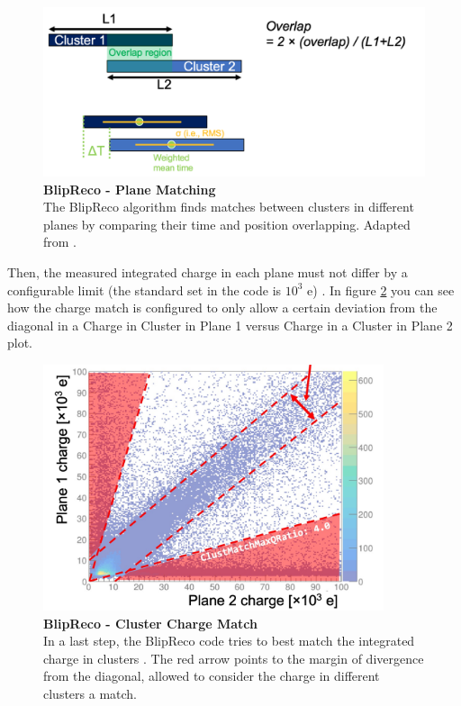 \begin{figure}[h!]
    \centering
    \includegraphics[width=120mm]{Figures/blip_cluster_match.png}
    \caption[BlipReco - Plane Matching]{{\textbf{BlipReco - Plane Matching}}\\ The BlipReco algorithm finds matches between clusters in different planes by comparing their time and position overlapping. Adapted from \cite{will_CM_Aug}.}
    \label{plane-matching}
\end{figure}

Then, the measured integrated charge in each plane must not differ by a configurable limit (the standard set in the code is $10^3$ e) \cite{will_CM_Aug}. In figure \ref{charge_match} you can see how the charge match is configured to only allow a certain deviation from the diagonal in a Charge in Cluster in Plane 1 versus Charge in a Cluster in Plane 2 plot.

\begin{figure}[h!]
    \centering
    \includegraphics[width=100mm]{Figures/blip_charge_match.png}
    \caption[BlipReco - Cluster Charge Match]{{\textbf{BlipReco - Cluster Charge Match}}\\ In a last step, the BlipReco code tries to best match the integrated charge in clusters \cite{will_CM_Aug}. The red arrow points to the margin of divergence from the diagonal, allowed to consider the charge in different clusters a match. }
    \label{charge_match}
\end{figure}

